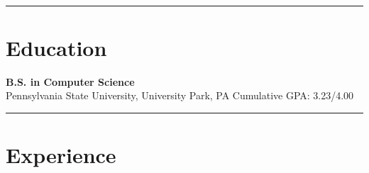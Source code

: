 \documentclass[letterpaper]{article}
\newcommand{\setfontsize}{\fontsize{11.5}{16}\selectfont}
\newcommand{\sectionrule}[1] {
  \noindent\rule{\textwidth}{.1mm}
  \vspace{-11mm}
  \section{#1}
}
\newenvironment{indentsection}
  {\begin{adjustwidth}{10mm}{0pt}}
  {\end{adjustwidth}}
\begin{document}
  \setfontsize

  \vspace{2mm}\\


  \sectionrule{Education}

  \begin{indentsection}
    \textbf{B.S. in Computer Science}\\
    Pennsylvania State University, University Park, PA \hfill Cumulative GPA: 3.23/4.00
  \end{indentsection}

  \sectionrule{Experience}
\end{document}
